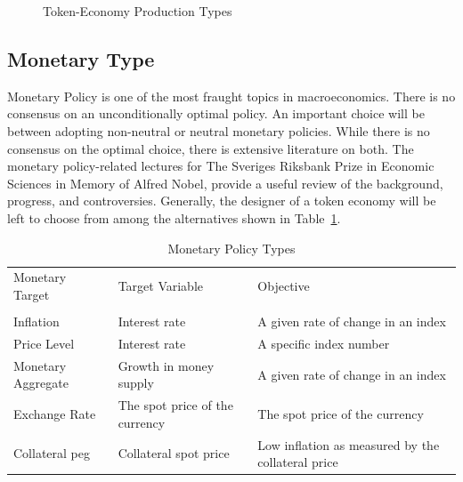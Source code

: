 \documentclass[11pt]{article}
\begin{document}
\begin{figure}[H]
\caption{Token-Economy Production Types} \label{fig:tept}
\end{figure}

\subsection{Monetary Type}
Monetary Policy is one of the most fraught topics in macroeconomics. There is no consensus on an unconditionally optimal policy. An important choice will be between adopting non-neutral or neutral monetary policies. While there is no consensus on the optimal choice, there is extensive literature on both. The monetary policy-related lectures for The Sveriges Riksbank Prize in Economic Sciences in Memory of Alfred Nobel\autocite{nobel}, provide a useful review of the background, progress, and controversies. Generally, the designer of a token economy will be left to choose from among the alternatives shown in Table~\ref{tbl:mpt}.

\begin{table}[H]
\caption{Monetary Policy Types} %
\small
\centering %
\begin{tabular}{l l l} %
\hline\hline %
Monetary Target & Target Variable & Objective \\ [0.5ex]
\\ [0.5ex]
\hline %
Inflation & Interest rate & A given rate of change in an index \\
Price Level & Interest rate & A specific index number \\
Monetary Aggregate & Growth in money supply & A given rate of change in an index \\ 
Exchange Rate & The spot price of the currency & The spot price of the currency \\ 
Collateral peg & Collateral spot price & Low inflation as measured by the collateral price \\ 
\hline %

\end{tabular}
\label{tbl:mpt}
\end{table}
\end{document}
